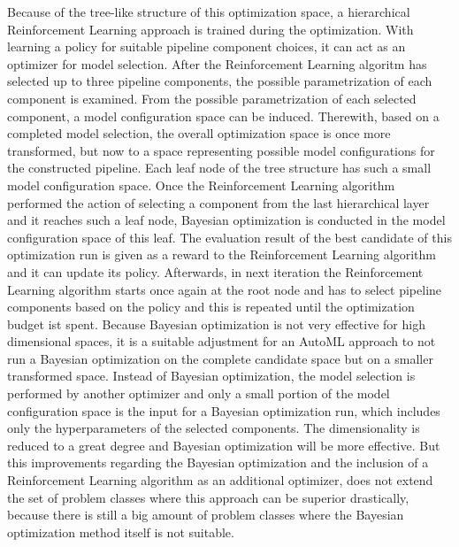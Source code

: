 Because of the tree-like structure of this optimization space, a hierarchical Reinforcement Learning approach is trained during the optimization.
With learning a policy for suitable pipeline component choices, it can act as an optimizer for model selection.\newline
After the Reinforcement Learning algoritm has selected up to three pipeline components, the possible parametrization of each component is examined.
From the possible parametrization of each selected component, a model configuration space can be induced.
Therewith, based on a completed model selection, the overall optimization space is once more transformed, but now to a space representing possible model configurations for the constructed pipeline.
Each leaf node of the tree structure has such a small model configuration space.\newline
Once the Reinforcement Learning algorithm performed the action of selecting a component from the last hierarchical layer and it reaches such a leaf node, Bayesian optimization is conducted in the model configuration space of this leaf.
The evaluation result of the best candidate of this optimization run is given as a reward to the Reinforcement Learning algorithm and it can update its policy.
Afterwards, in next iteration the Reinforcement Learning algorithm starts once again at the root node and has to select pipeline components based on the policy and this is repeated until the optimization budget ist spent.\newline
Because Bayesian optimization is not very effective for high dimensional spaces, it is a suitable adjustment for an AutoML approach to not run a Bayesian optimization on the complete candidate space but on a smaller transformed space.
Instead of Bayesian optimization, the model selection is performed by another optimizer and only a small portion of the model configuration space is the input for a Bayesian optimization run, which includes only the hyperparameters of the selected components.
The dimensionality is reduced to a great degree and Bayesian optimization will be more effective.\newline
But this improvements regarding the Bayesian optimization and the inclusion of a Reinforcement Learning algorithm as an additional optimizer, does not extend the set of problem classes where this approach can be superior drastically, because there is still a big amount of problem classes where the Bayesian optimization method itself is not suitable.

